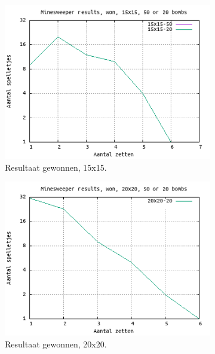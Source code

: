 \documentclass[10pt]{article}
\begin{document}
\begin{figure}[H]
  \begin{subfigure}{.49\textwidth}
    \centering
    \includegraphics[width=1\linewidth]{plot_15_15_won}
    \caption{Resultaat gewonnen, 15x15. }
    \label{fig:plot_15_15_won}
  \end{subfigure}
  \begin{subfigure}{.49\textwidth}
    \centering
    \includegraphics[width=1\linewidth]{plot_20_20_won}
    \caption{Resultaat gewonnen, 20x20. }
    \label{fig:plot_20_20_won}
  \end{subfigure}
  \begin{subfigure}{.49\textwidth}
    \centering

\end{subfigure}
\end{figure}
\end{document}
